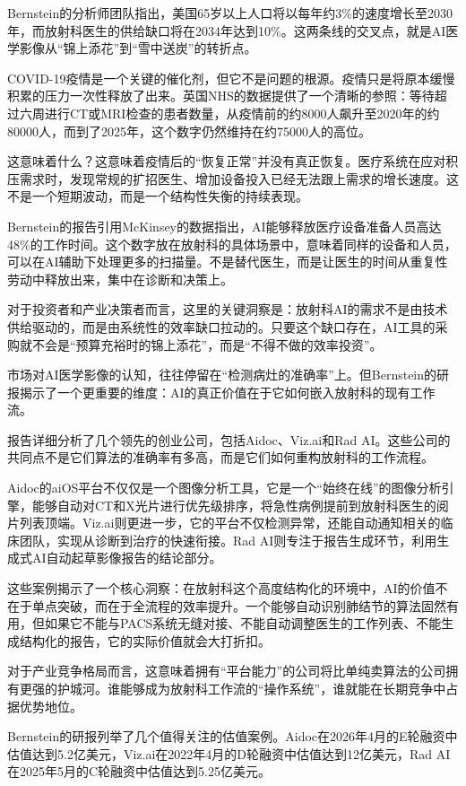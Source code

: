 \documentclass[11pt]{ctexart}
\begin{document}
Bernstein的分析师团队指出，美国65岁以上人口将以每年约3\%的速度增长至2030年，而放射科医生的供给缺口将在2034年达到10\%。这两条线的交叉点，就是AI医学影像从“锦上添花”到“雪中送炭”的转折点。

COVID-19疫情是一个关键的催化剂，但它不是问题的根源。疫情只是将原本缓慢积累的压力一次性释放了出来。英国NHS的数据提供了一个清晰的参照：等待超过六周进行CT或MRI检查的患者数量，从疫情前的约8000人飙升至2020年的约80000人，而到了2025年，这个数字仍然维持在约75000人的高位。

这意味着什么？这意味着疫情后的“恢复正常”并没有真正恢复。医疗系统在应对积压需求时，发现常规的扩招医生、增加设备投入已经无法跟上需求的增长速度。这不是一个短期波动，而是一个结构性失衡的持续表现。

Bernstein的报告引用McKinsey的数据指出，AI能够释放医疗设备准备人员高达48\%的工作时间。这个数字放在放射科的具体场景中，意味着同样的设备和人员，可以在AI辅助下处理更多的扫描量。不是替代医生，而是让医生的时间从重复性劳动中释放出来，集中在诊断和决策上。

对于投资者和产业决策者而言，这里的关键洞察是：放射科AI的需求不是由技术供给驱动的，而是由系统性的效率缺口拉动的。只要这个缺口存在，AI工具的采购就不会是“预算充裕时的锦上添花”，而是“不得不做的效率投资”。

市场对AI医学影像的认知，往往停留在“检测病灶的准确率”上。但Bernstein的研报揭示了一个更重要的维度：AI的真正价值在于它如何嵌入放射科的现有工作流。

报告详细分析了几个领先的创业公司，包括Aidoc、Viz.ai和Rad AI。这些公司的共同点不是它们算法的准确率有多高，而是它们如何重构放射科的工作流程。

Aidoc的aiOS平台不仅仅是一个图像分析工具，它是一个“始终在线”的图像分析引擎，能够自动对CT和X光片进行优先级排序，将急性病例提前到放射科医生的阅片列表顶端。Viz.ai则更进一步，它的平台不仅检测异常，还能自动通知相关的临床团队，实现从诊断到治疗的快速衔接。Rad AI则专注于报告生成环节，利用生成式AI自动起草影像报告的结论部分。

这些案例揭示了一个核心洞察：在放射科这个高度结构化的环境中，AI的价值不在于单点突破，而在于全流程的效率提升。一个能够自动识别肺结节的算法固然有用，但如果它不能与PACS系统无缝对接、不能自动调整医生的工作列表、不能生成结构化的报告，它的实际价值就会大打折扣。

对于产业竞争格局而言，这意味着拥有“平台能力”的公司将比单纯卖算法的公司拥有更强的护城河。谁能够成为放射科工作流的“操作系统”，谁就能在长期竞争中占据优势地位。

Bernstein的研报列举了几个值得关注的估值案例。Aidoc在2026年4月的E轮融资中估值达到5.2亿美元，Viz.ai在2022年4月的D轮融资中估值达到12亿美元，Rad AI在2025年5月的C轮融资中估值达到5.25亿美元。
\end{document}
